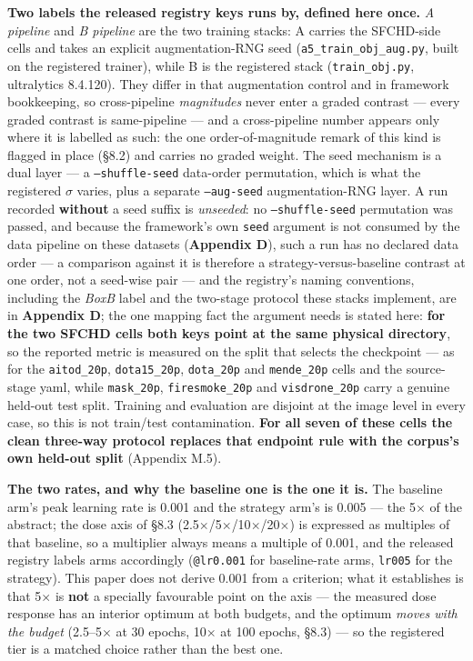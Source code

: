 \documentclass[pdflatex,sn-mathphys-ay]{sn-jnl}
\begin{document}
\textbf{Two labels the released registry keys runs by, defined here once.} \emph{A pipeline} and \emph{B pipeline} are the two training stacks: A carries the SFCHD-side cells and takes an explicit augmentation-RNG seed (\texttt{a5\_train\_obj\_aug.py}, built on the registered trainer), while B is the registered stack (\texttt{train\_obj.py}, ultralytics 8.4.120). They differ in that augmentation control and in framework bookkeeping, so cross-pipeline \emph{magnitudes} never enter a graded contrast --- every graded contrast is same-pipeline --- and a cross-pipeline number appears only where it is labelled as such: the one order-of-magnitude remark of this kind is flagged in place (\S{}8.2) and carries no graded weight. The seed mechanism is a dual layer --- a \texttt{--shuffle-seed} data-order permutation, which is what the registered \ensuremath{\sigma} varies, plus a separate \texttt{--aug-seed} augmentation-RNG layer. A run recorded \textbf{without} a seed suffix is \emph{unseeded}: no \texttt{--shuffle-seed} permutation was passed, and because the framework's own \texttt{seed} argument is not consumed by the data pipeline on these datasets (\textbf{Appendix D}), such a run has no declared data order --- a comparison against it is therefore a strategy-versus-baseline contrast at one order, not a seed-wise pair --- and the registry's naming conventions, including the \emph{BoxB} label and the two-stage protocol these stacks implement, are in \textbf{Appendix D}; the one mapping fact the argument needs is stated here: \textbf{for the two SFCHD cells both keys point at the same physical directory}, so the reported metric is measured on the split that selects the checkpoint --- as for the \texttt{aitod\_20p}, \texttt{dota15\_20p}, \texttt{dota\_20p} and \texttt{mende\_20p} cells and the source-stage yaml, while \texttt{mask\_20p}, \texttt{firesmoke\_20p} and \texttt{visdrone\_20p} carry a genuine held-out test split. Training and evaluation are disjoint at the image level in every case, so this is not train/test contamination. \textbf{For all seven of these cells the clean three-way protocol replaces that endpoint rule with the corpus's own held-out split} (Appendix M.5).

\textbf{The two rates, and why the baseline one is the one it is.} The baseline arm's peak learning rate is 0.001 and the strategy arm's is 0.005 --- the 5\ensuremath{\times} of the abstract; the dose axis of \S{}8.3 (2.5\ensuremath{\times}/5\ensuremath{\times}/10\ensuremath{\times}/20\ensuremath{\times}) is expressed as multiples of that baseline, so a multiplier always means a multiple of 0.001, and the released registry labels arms accordingly (\texttt{@lr0.001} for baseline-rate arms, \texttt{lr005} for the strategy). This paper does not derive 0.001 from a criterion; what it establishes is that 5\ensuremath{\times} is \textbf{not} a specially favourable point on the axis --- the measured dose response has an interior optimum at both budgets, and the optimum \emph{moves with the budget} (2.5--5\ensuremath{\times} at 30 epochs, 10\ensuremath{\times} at 100 epochs, \S{}8.3) --- so the registered tier is a matched choice rather than the best one.
\end{document}
